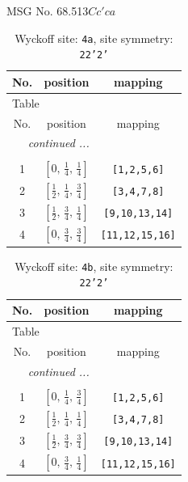 \documentclass[fleqn,8pt]{jsarticle}
\begin{document}
\setcounter{MaxMatrixCols}{32}

\renewcommand{\tablename}{Table~}
\renewcommand{\figurename}{Figure~}
\begin{center}
\LARGE
MSG No. 68.513\quad$Cc'ca$
\end{center}
\renewcommand{\arraystretch}{1.2}
\begin{longtable}{ccc}
\caption{Wyckoff site: {\tt 4a}, site symmetry: {\tt 22'2'}}
 \\
 \hline \hline
No. & position & mapping \\ \hline \endfirsthead

\multicolumn{2}{l}{\tablename\ \thetable{}} \\
 \hline \hline
No. & position & mapping \\ \hline \endhead

 \hline \hline
\multicolumn{2}{r}{\footnotesize\it continued ...} \\ \endfoot

 \hline \hline
\multicolumn{2}{r}{} \\ \endlastfoot

1 & $\left[ 0,\, \frac{1}{4},\, \frac{1}{4} \right]$ & {\tt [1,2,5,6]} \\ \hline
2 & $\left[ \frac{1}{2},\, \frac{1}{4},\, \frac{3}{4} \right]$ & {\tt [3,4,7,8]} \\ \hline
3 & $\left[ \frac{1}{2},\, \frac{3}{4},\, \frac{1}{4} \right]$ & {\tt [9,10,13,14]} \\ \hline
4 & $\left[ 0,\, \frac{3}{4},\, \frac{3}{4} \right]$ & {\tt [11,12,15,16]} \\
\end{longtable}
\renewcommand{\arraystretch}{1.2}
\begin{longtable}{ccc}
\caption{Wyckoff site: {\tt 4b}, site symmetry: {\tt 22'2'}}
 \\
 \hline \hline
No. & position & mapping \\ \hline \endfirsthead

\multicolumn{2}{l}{\tablename\ \thetable{}} \\
 \hline \hline
No. & position & mapping \\ \hline \endhead

 \hline \hline
\multicolumn{2}{r}{\footnotesize\it continued ...} \\ \endfoot

 \hline \hline
\multicolumn{2}{r}{} \\ \endlastfoot

1 & $\left[ 0,\, \frac{1}{4},\, \frac{3}{4} \right]$ & {\tt [1,2,5,6]} \\ \hline
2 & $\left[ \frac{1}{2},\, \frac{1}{4},\, \frac{1}{4} \right]$ & {\tt [3,4,7,8]} \\ \hline
3 & $\left[ \frac{1}{2},\, \frac{3}{4},\, \frac{3}{4} \right]$ & {\tt [9,10,13,14]} \\ \hline
4 & $\left[ 0,\, \frac{3}{4},\, \frac{1}{4} \right]$ & {\tt [11,12,15,16]} \\
\end{longtable}
\end{document}
